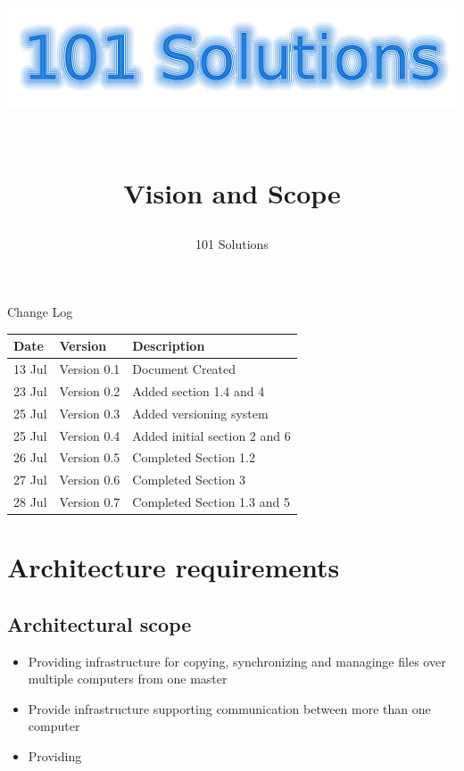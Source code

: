 \documentclass[a4paper,12pt,final]{article}
\title{
\begin{center}
  	\includegraphics[scale=0.3]{101Logo.png} 
  \end{center}
  \textbf{\\}
Vision and Scope\\
}
\author{101 Solutions}
\begin{document}
\maketitle
\thispagestyle{empty}
\newpage
\tableofcontents
\thispagestyle{empty}
\newpage
Change Log
\vspace{6pt}\newline
\begin{tabular}{|l|l|l|}
\hline
Date & Version & Description\\
\hline
13 Jul & Version 0.1 & Document Created\\
\hline
23 Jul & Version 0.2 & Added section 1.4 and 4\\
\hline
25 Jul & Version 0.3 & Added versioning system\\
\hline
25 Jul & Version 0.4 & Added initial section 2 and 6\\
\hline
26 Jul & Version 0.5 & Completed Section 1.2\\
\hline
27 Jul & Version 0.6 & Completed Section 3\\
\hline
28 Jul & Version 0.7 & Completed Section 1.3 and 5\\
\hline
\end{tabular}

\section{Architecture requirements}
\subsection{Architectural scope}
\begin{itemize}
\item Providing infrastructure for copying, synchronizing and managinge files over multiple computers from one master
\item Provide infrastructure supporting communication between more than one computer
\item Providing 
\end{itemize}
\end{document}
